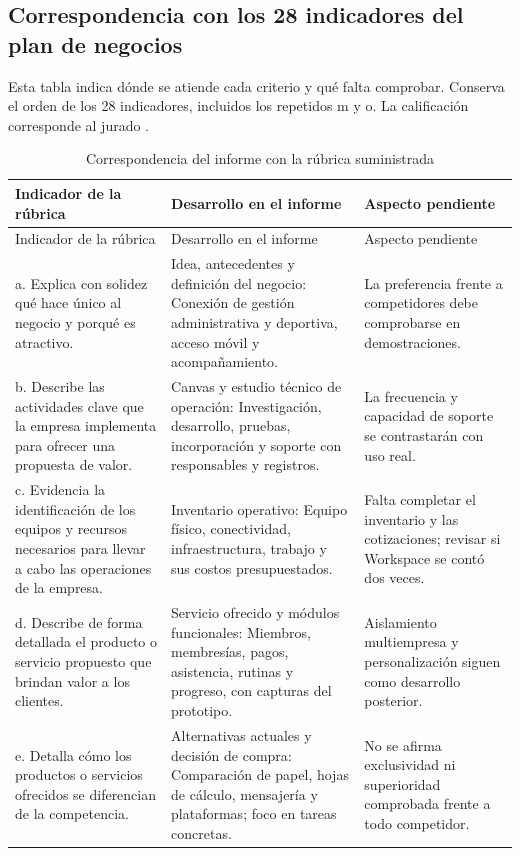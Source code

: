 \subsection{Correspondencia con los 28 indicadores del plan de negocios}
\label{ap:rubrica}
Esta tabla indica dónde se atiende cada criterio y qué falta comprobar. Conserva el orden de los 28 indicadores, incluidos los repetidos m y o. La calificación corresponde al jurado \parencite{rubrica_plan_negocios_2026}.
\begin{longtable}{p{4.0cm}p{5.6cm}p{4.2cm}}
\caption{Correspondencia del informe con la rúbrica suministrada}\\
\toprule Indicador de la rúbrica & Desarrollo en el informe & Aspecto pendiente \\
\midrule\endfirsthead
\toprule Indicador de la rúbrica & Desarrollo en el informe & Aspecto pendiente \\
\midrule\endhead
a. Explica con solidez qué hace único al negocio y porqué es atractivo. & Idea, antecedentes y definición del negocio: Conexión de gestión administrativa y deportiva, acceso móvil y acompañamiento. & La preferencia frente a competidores debe comprobarse en demostraciones. \\
b. Describe las actividades clave que la empresa implementa para ofrecer una propuesta de valor. & Canvas y estudio técnico de operación: Investigación, desarrollo, pruebas, incorporación y soporte con responsables y registros. & La frecuencia y capacidad de soporte se contrastarán con uso real. \\
c. Evidencia la identificación de los equipos y recursos necesarios para llevar a cabo las operaciones de la empresa. & Inventario operativo: Equipo físico, conectividad, infraestructura, trabajo y sus costos presupuestados. & Falta completar el inventario y las cotizaciones; revisar si Workspace se contó dos veces. \\
d. Describe de forma detallada el producto o servicio propuesto que brindan valor a los clientes. & Servicio ofrecido y módulos funcionales: Miembros, membresías, pagos, asistencia, rutinas y progreso, con capturas del prototipo. & Aislamiento multiempresa y personalización siguen como desarrollo posterior. \\
e. Detalla cómo los productos o servicios ofrecidos se diferencian de la competencia. & Alternativas actuales y decisión de compra: Comparación de papel, hojas de cálculo, mensajería y plataformas; foco en tareas concretas. & No se afirma exclusividad ni superioridad comprobada frente a todo competidor. \\

\end{longtable}
